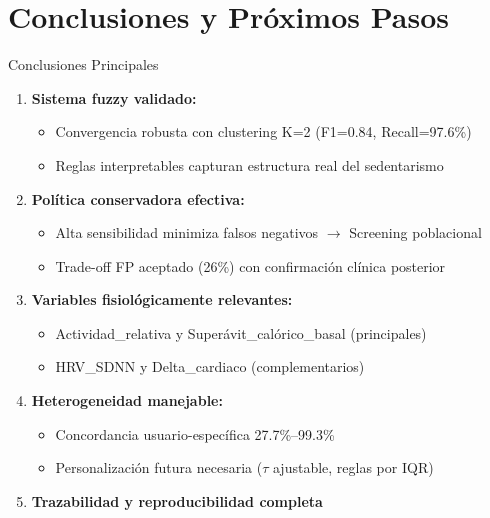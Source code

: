 \documentclass[aspectratio=169]{beamer}
\begin{document}
\section{Conclusiones y Próximos Pasos}

\begin{frame}{Conclusiones Principales}

\begin{enumerate}
    \item \textbf{Sistema fuzzy validado:}
    \begin{itemize}
        \item Convergencia robusta con clustering K=2 (F1=0.84, Recall=97.6\%)
        \item Reglas interpretables capturan estructura real del sedentarismo
    \end{itemize}
    
    \item \textbf{Política conservadora efectiva:}
    \begin{itemize}
        \item Alta sensibilidad minimiza falsos negativos $\rightarrow$ Screening poblacional
        \item Trade-off FP aceptado (26\%) con confirmación clínica posterior
    \end{itemize}
    
    \item \textbf{Variables fisiológicamente relevantes:}
    \begin{itemize}
        \item Actividad\_relativa y Superávit\_calórico\_basal (principales)
        \item HRV\_SDNN y Delta\_cardiaco (complementarios)
    \end{itemize}
    
    \item \textbf{Heterogeneidad manejable:}
    \begin{itemize}
        \item Concordancia usuario-específica 27.7\%--99.3\%
        \item Personalización futura necesaria ($\tau$ ajustable, reglas por IQR)
    \end{itemize}
    
    \item \textbf{Trazabilidad y reproducibilidad completa}
\end{enumerate}

\end{frame}
\end{document}
